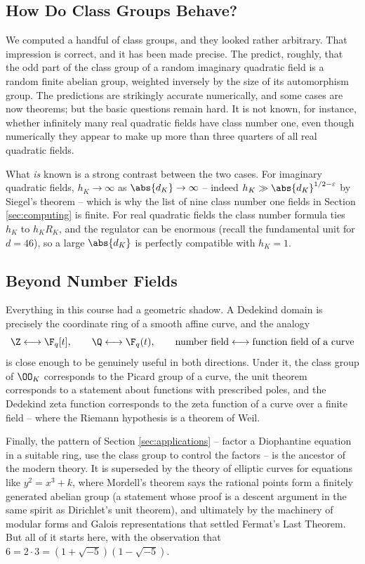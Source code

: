 \subsection{How Do Class Groups Behave?}

We computed a handful of class groups, and they looked rather arbitrary. That impression is correct, and it has been made precise. The  predict, roughly, that the odd part of the class group of a random imaginary quadratic field is a random finite abelian group, weighted inversely by the size of its automorphism group. The predictions are strikingly accurate numerically, and some cases are now theorems; but the basic questions remain hard. It is not known, for instance, whether infinitely many real quadratic fields have class number one, even though numerically they appear to make up more than three quarters of all real quadratic fields.

What \emph{is} known is a strong contrast between the two cases. For imaginary quadratic fields, $h_K \to \infty$ as $\abs{d_K}\to\infty$ -- indeed $h_K \gg \abs{d_K}^{1/2-\varepsilon}$ by Siegel's theorem -- which is why the list of nine class number one fields in Section \ref{sec:computing} is finite. For real quadratic fields the class number formula ties $h_K$ to $h_KR_K$, and the regulator can be enormous (recall the fundamental unit for $d = 46$), so a large $\abs{d_K}$ is perfectly compatible with $h_K = 1$.

\subsection{Beyond Number Fields}

Everything in this course had a geometric shadow. A Dedekind domain is precisely the coordinate ring of a smooth affine curve, and the analogy
$$\Z \longleftrightarrow \F_q[t], \qquad \Q \longleftrightarrow \F_q(t), \qquad \text{number field} \longleftrightarrow \text{function field of a curve}$$
is close enough to be genuinely useful in both directions. Under it, the class group of $\OO_K$ corresponds to the Picard group of a curve, the unit theorem corresponds to a statement about functions with prescribed poles, and the Dedekind zeta function corresponds to the zeta function of a curve over a finite field -- where the Riemann hypothesis is a theorem of Weil.

Finally, the pattern of Section \ref{sec:applications} -- factor a Diophantine equation in a suitable ring, use the class group to control the factors -- is the ancestor of the modern theory. It is superseded by the theory of elliptic curves for equations like $y^2 = x^3+k$, where Mordell's theorem says the rational points form a finitely generated abelian group (a statement whose proof is a descent argument in the same spirit as Dirichlet's unit theorem), and ultimately by the machinery of modular forms and Galois representations that settled Fermat's Last Theorem. But all of it starts here, with the observation that $6 = 2\cdot3 = (1+\sqrt{-5})(1-\sqrt{-5})$.

